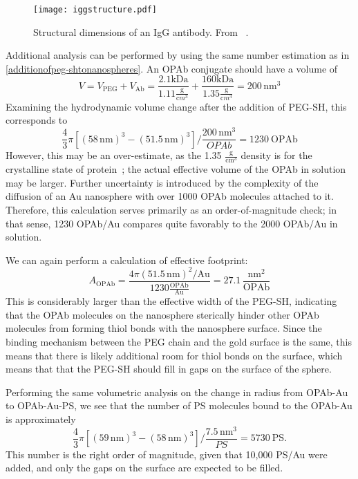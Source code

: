 \begin{figure}[htbp]
\centering
\texttt{[image: iggstructure.pdf]}
\caption{Structural dimensions of an IgG antibody. From ~\citep{antibodylength}.}
\label{iggstructure}
\end{figure}




Additional analysis can be performed by using the same number estimation as in \autoref{additionofpeg-shtonanospheres}. An OPAb conjugate should have a volume of
\[V=V_{\mathrm{PEG}}+V_{\mathrm{Ab}}=\frac{2.1\mathrm{kDa}}{1.11\frac{\mathrm g}{\mathrm cm^3}}+\frac{160\mathrm{kDa}}{1.35\frac{\mathrm g}{\mathrm cm^3}}=200\,\mathrm{nm}^3\]
Examining the hydrodynamic volume change after the addition of PEG-SH, this corresponds to
\[\frac{4}{3}\pi[(58\mathrm{\,nm})^3-(51.5\mathrm{\,nm})^3]/\frac{200\,\mathrm{nm}^3}{OPAb}=1230\mathrm{\ OPAb}\]
However, this may be an over-estimate, as the 1.35 $\mathrm{\frac{g}{cm^3}}$ density is for the crystalline state of protein~\citep{proteindensity}; the actual effective volume of the OPAb in solution may be larger. Further uncertainty is introduced by the complexity of the diffusion of an Au nanosphere with over 1000 OPAb molecules attached to it. Therefore, this calculation serves primarily as an order-of-magnitude check; in that sense, 1230 OPAb\slash Au compares quite favorably to the 2000 OPAb\slash Au in solution.

We can again perform a calculation of effective footprint: \[A_{\mathrm{OPAb}}=\frac{4\pi(51.5\mathrm{\,nm})^2/\mathrm{Au}}{1230\mathrm{\frac{OPAb}{Au}}}=27.1\,\frac{\mathrm{nm}^2}{\mathrm{OPAb}}\]
This is considerably larger than the effective width of the PEG-SH, indicating that the OPAb molecules on the nanosphere sterically hinder other OPAb molecules from forming thiol bonds with the nanosphere surface. Since the binding mechanism between the PEG chain and the gold surface is the same, this means that there is likely additional room for thiol bonds on the surface, which means that that the PEG-SH should fill in gaps on the surface of the sphere.

Performing the same volumetric analysis on the change in radius from OPAb-Au to OPAb-Au-PS, we see that the number of PS molecules bound to the OPAb-Au is approximately
\[\frac{4}{3}\pi[(59\mathrm{\,nm})^3-(58\mathrm{\,nm})^3]/\frac{7.5\,\mathrm{nm}^3}{PS}=5730\mathrm{\ PS}.\]
This number is the right order of magnitude, given that 10,000 PS\slash Au were added, and only the gaps on the surface are expected to be filled.

